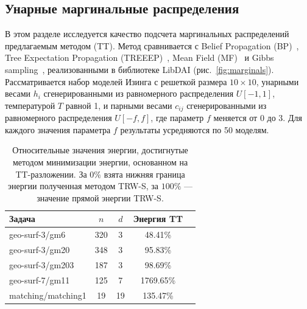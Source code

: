 \subsection{Унарные маргинальные распределения \label{sec::expMarg}}
В этом разделе исследуется качество подсчета маргинальных распределений предлагаемым методом (TT). Метод сравнивается с Belief Propagation (BP)~\cite{kschischang01bp}, Tree Expectation Propagation (TREEEP)~\cite{minka04treeep},  Mean Field (MF)~\cite{wainwright08gm} и Gibbs sampling~\cite{wainwright08gm}, реализованными в библиотеке LibDAI (рис.~\ref{fig:marginals}). Рассматривается набор моделей Изинга с решеткой размера $10 \times 10$, унарными весами $h_i$ сгенерированными из равномерного распределения $U[-1, 1]$, температурой $T$ равной 1, и парными весами $c_{ij}$ сгенерированными из равномерного распределения $U[-f, f]$, где параметр $f$ меняется от $0$ до $3$. Для каждого значения параметра $f$ результаты усредняются по 50 моделям.
%
\begin{table}[t]
\caption{Относительные значения энергии, достигнутые методом минимизации энергии, основанном на TT\hyp{}разложении. За $0\%$ взята нижняя граница энергии полученная методом TRW-S, за $100\%$ --- значение прямой энергии TRW-S.
\label{tbl:map}}
\vskip 0.15in
\begin{center}
\begin{small}
\begin{tabular}{lcccr}
\hline
Задача & $n$ & $d$ & Энергия TT  \\
\hline
geo-surf-3/gm6   & 320 & 3 & 48.41\% \\
geo-surf-3/gm20 & 348 & 3 & 95.83\%  \\
geo-surf-3/gm203    & 187 & 3 & 98.69\%  \\
geo-surf-7/gm11   & 125 & 7 & 1769.65\%  \\
matching/matching1    & 19 & 19 & 135.47\%   \\
\hline
\end{tabular}
\end{small}
\end{center}
\vskip -0.1in
\end{table}

